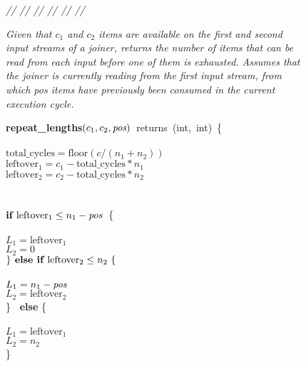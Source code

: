 \begin{figure}[t]
\begin{minipage}{0.1in}
\vspace{-1.75pt}
{\it // // // // // //}
\end{minipage}
\begin{minipage}{3.23in}
{\it Given that $c_1$ and $c_2$ items are available on the first and
  second input streams of a joiner, returns the number of items that
  can be read from each input before one of them is exhausted.
  Assumes that the joiner is currently reading from the first input
  stream, from which \mbox{pos} items have previously been consumed in
  the current execution cycle.}
\end{minipage}
\mbox{\bf repeat\_lengths}$(c_1, c_2, \mbox{\it pos} )$~returns~(int,~int)~\{\\
\\
\tab$\mbox{total\_cycles} = \mbox{floor}(c/(n_1 + n_2))$\\
\tab$\mbox{leftover}_1 = c_1 - \mbox{total\_cycles} * n_1$\\
\tab$\mbox{leftover}_2 = c_2 - \mbox{total\_cycles} * n_2$\\
~ \vspace{-6pt}\\
\\
\tab$\mbox{\bf if~} \mbox{leftover}_1 \leq n_1 - \mbox{\it pos}$~\{\\
\tab{}\\
\tab\tab$L_1 = \mbox{leftover}_1$\\
\tab\tab$L_2 = 0$\\
\tab$\} \mbox{\bf~else if~} \mbox{leftover}_2 \leq n_2~\{$\\
\tab{}\\
\tab\tab$L_1 = n_1-\mbox{\it pos}$\\
\tab\tab$L_2 = \mbox{leftover}_2$\\
\tab\} \mbox{\bf ~else} \{\\
\tab{}\\
\tab\tab$L_1 = \mbox{leftover}_1$\\
\tab\tab$L_2 = n_2$\\
\tab\}\\
~ \vspace{-6pt}\\ 

\end{figure}
